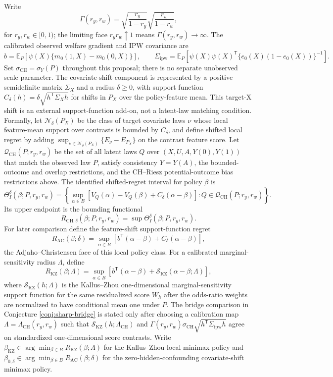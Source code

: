 \documentclass[11pt]{article}
\newcommand{\E}{\mathbb{E}}
\newcommand{\transpose}{\mathsf{T}}
\theoremstyle{definition}
\theoremstyle{plain}
\theoremstyle{remark}
\begin{document}
Write
\[
  \Gamma(r_y,r_w)=
  \sqrt{\frac{r_y}{1-r_y}}\sqrt{\frac{r_w}{1-r_w}},
\]
for $r_y,r_w\in[0,1)$; the limiting face $r_y r_w\uparrow1$ means $\Gamma(r_y,r_w)\to\infty$. The calibrated observed welfare gradient and IPW covariance are
\[
  b=\E_P\!\left[\psi(X)\{m_0(1,X)-m_0(0,X)\}\right],\qquad
  \Sigma_{\mathrm{ipw}}=\E_P\!\left[
    \psi(X)\psi(X)^\transpose \{e_0(X)(1-e_0(X))\}^{-1}\right].
\]
Set $\sigma_{\mathrm{CH}}=\sigma_Y(P)$ throughout this proposal; there is no separate unobserved scale parameter. The covariate-shift component is represented by a positive semidefinite matrix $\Sigma_X$ and a radius $\delta\ge0$, with support function
$C_\delta(h)=\delta\sqrt{h^\transpose\Sigma_Xh}$ for shifts in $P_X$ over the policy-feature mean. This target-X shift is an external support-function add-on, not a latent-law matching condition. Formally, let $\mathcal N_\delta(P_X)$ be the class of target covariate laws $\nu$ whose local feature-mean support over contrasts is bounded by $C_\delta$, and define shifted local regret by adding $\sup_{\nu\in\mathcal N_\delta(P_X)}\{E_\nu-E_{P_X}\}$ on the contrast feature score. Let $\mathcal Q_{\mathrm{CH}}(P;r_y,r_w)$ be the set of all latent laws $Q$ over $(X,U,A,Y(0),Y(1))$ that match the observed law $P$, satisfy consistency $Y=Y(A)$, the bounded-outcome and overlap restrictions, and the CH--Riesz potential-outcome bias restrictions above. The identified shifted-regret interval for policy $\beta$ is
\[
  \Theta_I^\delta(\beta;P,r_y,r_w)
  =
  \left\{
  \sup_{\alpha\in B}\left[
    V_Q(\alpha)-V_Q(\beta)+C_\delta(\alpha-\beta)
  \right]
  :Q\in\mathcal Q_{\mathrm{CH}}(P;r_y,r_w)
  \right\}.
\]
Its upper endpoint is the bounding functional
\[
  R_{\mathrm{CH},\delta}(\beta;P,r_y,r_w)
  =\sup \Theta_I^\delta(\beta;P,r_y,r_w).
\]
For later comparison define the feature-shift support-function regret
\[
  R_{\mathrm{AC}}(\beta;\delta)=
  \sup_{\alpha\in B}\left[
    b^\transpose(\alpha-\beta)+C_\delta(\alpha-\beta)
  \right],
\]
the Adjaho--Christensen face of this local policy class. For a calibrated marginal-sensitivity radius $\Lambda$, define
\[
  R_{\mathrm{KZ}}(\beta;\Lambda)=
  \sup_{\alpha\in B}\left[
    b^\transpose(\alpha-\beta)+
    \mathcal S_{\mathrm{KZ}}(\alpha-\beta;\Lambda)
  \right],
\]
where $\mathcal S_{\mathrm{KZ}}(h;\Lambda)$ is the Kallus--Zhou one-dimensional marginal-sensitivity support function for the same residualized score $W_h$ after the odds-ratio weights are normalized to have conditional mean one under $P$. The bridge comparison in Conjecture \ref{conj:sharp-bridge} is stated only after choosing a calibration map $\Lambda=\Lambda_{\mathrm{CH}}(r_y,r_w)$ such that
$\mathcal S_{\mathrm{KZ}}(h;\Lambda_{\mathrm{CH}})$ and
$\Gamma(r_y,r_w)\sigma_{\mathrm{CH}}\sqrt{h^\transpose\Sigma_{\mathrm{ipw}}h}$
agree on standardized one-dimensional score contrasts.
Write $\beta_{\mathrm{KZ}}\in\arg\min_{\beta\in B}R_{\mathrm{KZ}}(\beta;\Lambda)$ for the Kallus--Zhou local minimax policy and $\beta_{0,\delta}\in\arg\min_{\beta\in B}R_{\mathrm{AC}}(\beta;\delta)$ for the zero-hidden-confounding covariate-shift minimax policy.
\end{document}
